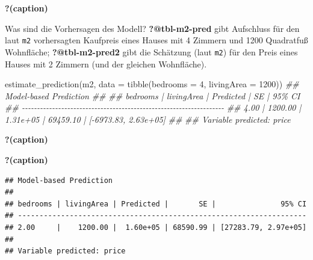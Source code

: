 \documentclass[
  a4paper,
  DIV=11]{scrreprt}
\newenvironment{Shaded}{\begin{snugshade}}{\end{snugshade}}
\newcommand{\AttributeTok}[1]{\textcolor[rgb]{0.40,0.45,0.13}{#1}}
\newcommand{\DecValTok}[1]{\textcolor[rgb]{0.68,0.00,0.00}{#1}}
\newcommand{\DocumentationTok}[1]{\textcolor[rgb]{0.37,0.37,0.37}{\textit{#1}}}
\newcommand{\FunctionTok}[1]{\textcolor[rgb]{0.28,0.35,0.67}{#1}}
\newcommand{\NormalTok}[1]{\textcolor[rgb]{0.00,0.23,0.31}{#1}}
\theoremstyle{definition}
\theoremstyle{remark}
\begin{document}
\begin{table}

\caption{\textbf{?(caption)}}

\end{table}

Was sind die Vorhersagen des Modell? \textbf{?@tbl-m2-pred} gibt
Aufschluss für den laut \texttt{m2} vorhersagten Kaufpreis eines Hauses
mit 4 Zimmern und 1200 Quadratfuß Wohnfläche; \textbf{?@tbl-m2-pred2}
gibt die Schätzung (laut \texttt{m2}) für den Preis eines Hauses mit 2
Zimmern (und der gleichen Wohnfläche).

\begin{Shaded}
\begin{Highlighting}[]
\FunctionTok{estimate\_prediction}\NormalTok{(m2, }\AttributeTok{data =} \FunctionTok{tibble}\NormalTok{(}\AttributeTok{bedrooms =} \DecValTok{4}\NormalTok{, }\AttributeTok{livingArea =} \DecValTok{1200}\NormalTok{))}
\DocumentationTok{\#\# Model{-}based Prediction}
\DocumentationTok{\#\# }
\DocumentationTok{\#\# bedrooms | livingArea | Predicted |       SE |               95\% CI}
\DocumentationTok{\#\# {-}{-}{-}{-}{-}{-}{-}{-}{-}{-}{-}{-}{-}{-}{-}{-}{-}{-}{-}{-}{-}{-}{-}{-}{-}{-}{-}{-}{-}{-}{-}{-}{-}{-}{-}{-}{-}{-}{-}{-}{-}{-}{-}{-}{-}{-}{-}{-}{-}{-}{-}{-}{-}{-}{-}{-}{-}{-}{-}{-}{-}{-}{-}{-}{-}{-}{-}}
\DocumentationTok{\#\# 4.00     |    1200.00 |  1.31e+05 | 69459.10 | [{-}6973.83, 2.63e+05]}
\DocumentationTok{\#\# }
\DocumentationTok{\#\# Variable predicted: price}
\end{Highlighting}
\end{Shaded}

\begin{table}

\caption{\textbf{?(caption)}}

\end{table}

\begin{table}

\caption{\textbf{?(caption)}}\begin{minipage}[t]{\linewidth}

{\centering 

\begin{verbatim}
## Model-based Prediction
## 
## bedrooms | livingArea | Predicted |       SE |               95% CI
## -------------------------------------------------------------------
## 2.00     |    1200.00 |  1.60e+05 | 68590.99 | [27283.79, 2.97e+05]
## 
## Variable predicted: price
\end{verbatim}

}

\end{minipage}%

\end{table}
\end{document}
